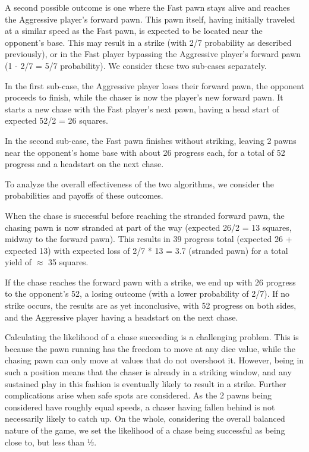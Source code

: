 \documentclass{article} %
\begin{document}
A second possible outcome is one where the Fast pawn stays alive and reaches the Aggressive player’s forward pawn. This pawn itself, having initially traveled at a similar speed as the Fast pawn, is expected to be located near the opponent’s base. This may result in a strike (with 2/7 probability as described previously), or in the Fast player bypassing the Aggressive player’s forward pawn (1 - 2/7 = 5/7 probability). We consider these two sub-cases separately.

In the first sub-case, the Aggressive player loses their forward pawn, the opponent proceeds to finish, while the chaser is now the player’s new forward pawn. It starts a new chase with the Fast player’s next pawn, having a head start of expected 52/2 = 26 squares.

In the second sub-case, the Fast pawn finishes without striking, leaving 2 pawns near the opponent’s home base with about 26 progress each, for a total of 52 progress and a headstart on the next chase.

To analyze the overall effectiveness of the two algorithms, we consider the probabilities and payoffs of these outcomes.

When the chase is successful before reaching the stranded forward pawn, the chasing pawn is now stranded at part of the way (expected 26/2 = 13 squares, midway to the forward pawn). This results in 39 progress total (expected 26 + expected 13) with expected loss of 2/7 * 13 = 3.7 (stranded pawn) for a total yield of $\approx$ 35 squares.

If the chase reaches the forward pawn with a strike, we end up with 26 progress to the opponent’s 52, a losing outcome (with a lower probability of 2/7). If no strike occurs, the results are as yet inconclusive, with 52 progress on both sides, and the Aggressive player having a headstart on the next chase.

Calculating the likelihood of a chase succeeding is a challenging problem. This is because the pawn running has the freedom to move at any dice value, while the chasing pawn can only move at values that do not overshoot it. However, being in such a position means that the chaser is already in a striking window, and any sustained play in this fashion is eventually likely to result in a strike. Further complications arise when safe spots are considered. As the 2 pawns being considered have roughly equal speeds, a chaser having fallen behind is not necessarily likely to catch up. On the whole, considering the overall balanced nature of the game, we set the likelihood of a chase being successful as being close to, but less than ½.
\end{document}
